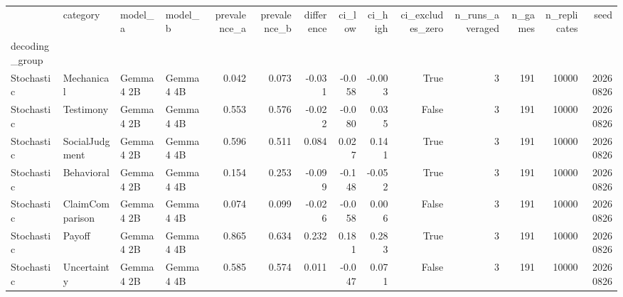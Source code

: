 \begin{tabular}{llllrrrrrrrrrr}
\toprule
 & category & model\_a & model\_b & prevalence\_a & prevalence\_b & difference & ci\_low & ci\_high & ci\_excludes\_zero & n\_runs\_averaged & n\_games & n\_replicates & seed \\
decoding_group &  &  &  &  &  &  &  &  &  &  &  &  &  \\
\midrule
Stochastic & Mechanical & Gemma 4 2B & Gemma 4 4B & 0.042 & 0.073 & -0.031 & -0.058 & -0.003 & True & 3 & 191 & 10000 & 20260826 \\
Stochastic & Testimony & Gemma 4 2B & Gemma 4 4B & 0.553 & 0.576 & -0.022 & -0.080 & 0.035 & False & 3 & 191 & 10000 & 20260826 \\
Stochastic & SocialJudgment & Gemma 4 2B & Gemma 4 4B & 0.596 & 0.511 & 0.084 & 0.027 & 0.141 & True & 3 & 191 & 10000 & 20260826 \\
Stochastic & Behavioral & Gemma 4 2B & Gemma 4 4B & 0.154 & 0.253 & -0.099 & -0.148 & -0.052 & True & 3 & 191 & 10000 & 20260826 \\
Stochastic & ClaimComparison & Gemma 4 2B & Gemma 4 4B & 0.074 & 0.099 & -0.026 & -0.058 & 0.006 & False & 3 & 191 & 10000 & 20260826 \\
Stochastic & Payoff & Gemma 4 2B & Gemma 4 4B & 0.865 & 0.634 & 0.232 & 0.181 & 0.283 & True & 3 & 191 & 10000 & 20260826 \\
Stochastic & Uncertainty & Gemma 4 2B & Gemma 4 4B & 0.585 & 0.574 & 0.011 & -0.047 & 0.071 & False & 3 & 191 & 10000 & 20260826 \\
\bottomrule
\end{tabular}
